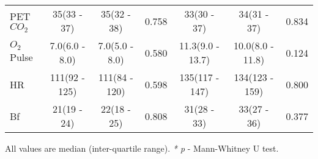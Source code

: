 \begin{sidewaystable}[p]
\begin{tabular}{|l | c c c | c c c|}
			PET$CO_2$                    & 35(33 - 37)       & 35(32 - 38)       & 0.758 & 33(30 - 37)       & 34(31 - 37)       & 0.834 \\
			$O_2$Pulse                   & 7.0(6.0 - 8.0)    & 7.0(5.0 - 8.0)    & 0.580 & 11.3(9.0 - 13.7)  & 10.0(8.0 - 11.8)  & 0.124 \\
			HR                           & 111(92 - 125)     & 111(84 - 120)     & 0.598 & 135(117 - 147)    & 134(123 - 159)    & 0.800 \\
			Bf                           & 21(19 - 24)       & 22(18 - 25)       & 0.808 & 31(28 - 33)       & 33(27 - 36)       & 0.377 \\ \hline
		\end{tabular}
	
	
	All values are median (inter-quartile range). \textit{* p} - Mann-Whitney U test.
\end{sidewaystable}







